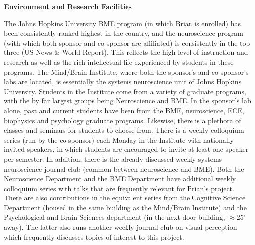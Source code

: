 \documentclass[11pt,notitlepage]{article}
\begin{document}
\textbf{Environment and Research Facilities}

The Johns Hopkins University BME program (in which Brian is enrolled)
has been consistently ranked highest in the country, 
and
the neuroscience
program (with which both sponsor and co-sponsor are affiliated)
is
consistently in the top three (US News \& World Report). This reflects
the high level of instruction and research as well as the rich
intellectual life experienced by students in these programs. The
Mind/Brain Institute, where both the sponsor's and co-sponsor's labs
are located, is essentially the systems neuroscience unit of Johns
Hopkins University. Students in the Institute come from a variety of
graduate programs, with the by far largest groups being Neuroscience
and BME.
In the sponsor's lab alone, past and current students have
been from the BME, neuroscience, ECE, biophysics and psychology
graduate programs. Likewise, there is a plethora of classes and
seminars for students to choose from. There is a weekly colloquium
series (run by the co-sponsor) each Monday in the Institute with
nationally invited speakers, in which students are encouraged to invite
at least one speaker per semester. In addition, there is the already
discussed  weekly systems neuroscience journal club (common between
neuroscience and BME). Both the Neuroscience
Department and the BME Department have additional weekly colloquium
series
with talks that are frequently relevant for Brian's project. 
There are also contributions in the equivalent
series from the Cognitive Science Department (housed in the same
building as the Mind/Brain Institute) and the Psychological and Brain
Sciences department (in the next-door building, $\approx 25'$ away). The
latter also runs another weekly journal club on visual perception
which frequently discusses topics of interest to this project.
\end{document}
